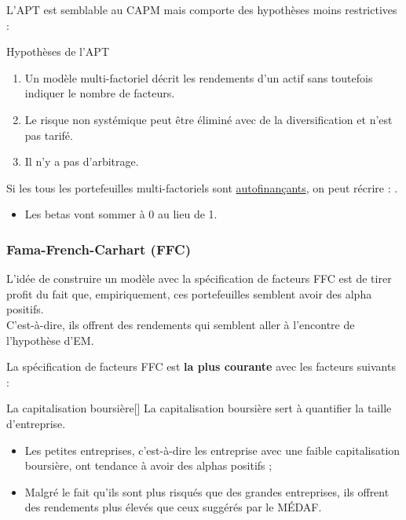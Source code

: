 \documentclass[10pt, french]{article}
\begin{document}
\begin{multicols*}{2}
L'APT est semblable au CAPM mais comporte des hypothèses moins restrictives :
\begin{conceptgen}{Hypothèses de l'APT}
\begin{enumerate}[label	=	\circled{\arabic*}{lightgray}]
	\item	Un modèle multi-factoriel décrit les rendements d'un actif sans toutefois indiquer le nombre de facteurs.
	\item	Le risque non systémique peut être éliminé avec de la diversification et n'est pas tarifé.
	\item	Il n'y a pas d'arbitrage.
\end{enumerate}
\end{conceptgen}

\begin{definitionNOHFILLprop}
Si les tous les portefeuilles multi-factoriels sont \hyperlink{autofin-ptf}{\color{trueblue}autofinançants}, on peut récrire : .
\begin{itemize}
	\item	Les betas vont sommer à 0 au lieu de 1.
\end{itemize}
\end{definitionNOHFILLprop}


\columnbreak
\subsubsection{Fama-French-Carhart (FFC)}
\begin{rappel_enhanced}[Contexte]
L'idée de construire un modèle avec la spécification de facteurs FFC est de tirer profit du fait que, empiriquement, ces portefeuilles semblent avoir des alpha positifs.\\
C'est-à-dire, ils offrent des rendements qui semblent aller à l'encontre de l'hypothèse d'EM.
\end{rappel_enhanced}

La spécification de facteurs FFC est \textbf{la plus courante} avec les facteurs suivants :

\begin{definitionGENERAL}{La capitalisation boursière}[]
La capitalisation boursière sert à quantifier la taille d'entreprise.	\\

\begin{itemize}
	\item	Les petites entreprises, c'est-à-dire les entreprise avec une faible capitalisation boursière, ont tendance à avoir des alphas positifs ;
	\item	Malgré le fait qu'ils sont plus risqués que des grandes entreprises, ils offrent des rendements plus élevés que ceux suggérés par le MÉDAF.
\end{itemize}
\end{definitionGENERAL}


\end{multicols*}
\end{document}
